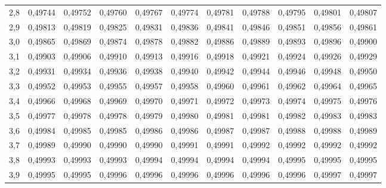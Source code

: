 \documentclass[a4paper]{article}
\begin{document}
\begin{center}
{\begin{tabular}{rrrrrrrrrrr}
  2,8 & 0,49744 & 0,49752 & 0,49760 & 0,49767 & 0,49774 & 0,49781 & 0,49788 & 0,49795 & 0,49801 & 0,49807 \\ 
  2,9 & 0,49813 & 0,49819 & 0,49825 & 0,49831 & 0,49836 & 0,49841 & 0,49846 & 0,49851 & 0,49856 & 0,49861 \\ 
  3,0 & 0,49865 & 0,49869 & 0,49874 & 0,49878 & 0,49882 & 0,49886 & 0,49889 & 0,49893 & 0,49896 & 0,49900 \\ 
  3,1 & 0,49903 & 0,49906 & 0,49910 & 0,49913 & 0,49916 & 0,49918 & 0,49921 & 0,49924 & 0,49926 & 0,49929 \\ 
  3,2 & 0,49931 & 0,49934 & 0,49936 & 0,49938 & 0,49940 & 0,49942 & 0,49944 & 0,49946 & 0,49948 & 0,49950 \\ 
  3,3 & 0,49952 & 0,49953 & 0,49955 & 0,49957 & 0,49958 & 0,49960 & 0,49961 & 0,49962 & 0,49964 & 0,49965 \\ 
  3,4 & 0,49966 & 0,49968 & 0,49969 & 0,49970 & 0,49971 & 0,49972 & 0,49973 & 0,49974 & 0,49975 & 0,49976 \\ 
  3,5 & 0,49977 & 0,49978 & 0,49978 & 0,49979 & 0,49980 & 0,49981 & 0,49981 & 0,49982 & 0,49983 & 0,49983 \\ 
  3,6 & 0,49984 & 0,49985 & 0,49985 & 0,49986 & 0,49986 & 0,49987 & 0,49987 & 0,49988 & 0,49988 & 0,49989 \\ 
  3,7 & 0,49989 & 0,49990 & 0,49990 & 0,49990 & 0,49991 & 0,49991 & 0,49992 & 0,49992 & 0,49992 & 0,49992 \\ 
  3,8 & 0,49993 & 0,49993 & 0,49993 & 0,49994 & 0,49994 & 0,49994 & 0,49994 & 0,49995 & 0,49995 & 0,49995 \\ 
  3,9 & 0,49995 & 0,49995 & 0,49996 & 0,49996 & 0,49996 & 0,49996 & 0,49996 & 0,49996 & 0,49997 & 0,49997 \\ 
   \hline
\end{tabular}}
\end{center}
\end{document}
